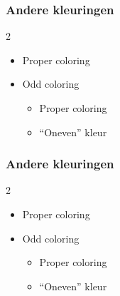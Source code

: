 \documentclass
[kulak] %
{kulakbeamer}
\begin{document}
	\begin{frame}
		\frametitle{Andere kleuringen}
		
		
		\begin{multicols}{2}
			
			\begin{itemize}
				\item Proper coloring
				\item Odd coloring
				\begin{itemize}
					\item Proper coloring
					\item ``Oneven'' kleur
				\end{itemize}
			\end{itemize}
			
			\vspace*{\fill}\null
			
			\pause
			\begin{center}
				\scalebox{.75}{}
			\end{center}
			
			
		\end{multicols}
		
		
	\end{frame}
	
	\begin{frame}
		\frametitle{Andere kleuringen}
		
		
		\begin{multicols}{2}
			
			\begin{itemize}
				\item Proper coloring
				\item Odd coloring
				\begin{itemize}
					\item Proper coloring
					\item ``Oneven'' kleur
				\end{itemize}
			\end{itemize}
			
			\vspace*{\fill}\null
			
			\begin{center}
				\scalebox{.75}{}
			\end{center}
			
			
		\end{multicols}
		
		
	\end{frame}
	
\end{document}
